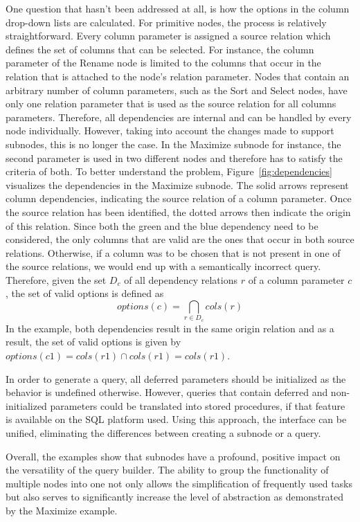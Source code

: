 \documentclass[11pt,a4paper]{globis-book}
\begin{document}
One question that hasn't been addressed at all, is how the options in the column drop-down lists are calculated. For primitive nodes, the process is relatively straightforward. Every column parameter is assigned a source relation which defines the set of columns that can be selected. For instance, the column parameter of the Rename node is limited to the columns that occur in the relation that is attached to the node's relation parameter. Nodes that contain an arbitrary number of column parameters, such as the Sort and Select nodes, have only one relation parameter that is used as the source relation for all columns parameters. Therefore, all dependencies are internal and can be handled by every node individually. However, taking into account the changes made to support subnodes, this is no longer the case. In the Maximize subnode for instance, the second parameter is used in two different nodes and therefore has to satisfy the criteria of both. To better understand the problem, Figure~\ref{fig:dependencies} visualizes the dependencies in the Maximize subnode. The solid arrows represent column dependencies, indicating the source relation of a column parameter. Once the source relation has been identified, the dotted arrows then indicate the origin of this relation. Since both the green and the blue dependency need to be considered, the only columns that are valid are the ones that occur in both source relations. Otherwise, if a column was to be chosen that is not present in one of the source relations, we would end up with a semantically incorrect query. Therefore, given the set $D_c$ of all dependency relations $r$ of a column parameter $c$, the set of valid options is defined as $$options(c) = \bigcap_{r \in D_c} cols(r)$$
In the example, both dependencies result in the same origin relation and as a result, the set of valid options is given by $options(c1) = cols(r1) \cap cols(r1) = cols(r1)$.

In order to generate a query, all deferred parameters should be initialized as the behavior is undefined otherwise. However, queries that contain deferred and non-initialized parameters could be translated into stored procedures, if that feature is available on the SQL platform used. Using this approach, the interface can be unified, eliminating the differences between creating a subnode or a query.

Overall, the examples show that subnodes have a profound, positive impact on the versatility of the query builder. The ability to group the functionality of multiple nodes into one not only allows the simplification of frequently used tasks but also serves to significantly increase the level of abstraction as demonstrated by the Maximize example.
\end{document}
